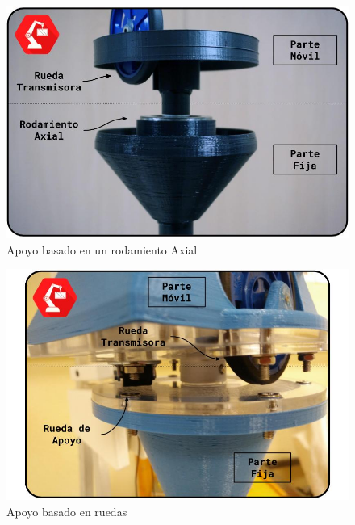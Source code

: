     \begin{minipage}{0.47\textwidth}
        \begin{figure}[H]
            \centering
            \includegraphics[width=\textwidth]{figuras/Imagenes_Mecanica/foto_brazo_12.jpg}
            \caption{Apoyo basado en un rodamiento Axial}
            \label{fig:Mecanica:apoyo_rodamiento_axial}
        \end{figure}
    \end{minipage}
    \begin{minipage}{0.47\textwidth}\raggedright
        \begin{figure}[H]
            \centering
            \includegraphics[width=\textwidth]{figuras/Imagenes_Mecanica/foto_brazo_anterior_1.jpg}
            \caption{Apoyo basado en ruedas}
            \label{fig:Mecanica:apoyo_ruedas}
        \end{figure}
    \end{minipage}

